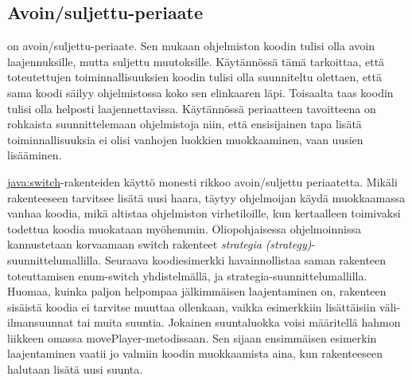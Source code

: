 \documentclass{tufte-book}
\newcommand{\eng}[1]{\textit{(#1)}}
\newcommand{\new}[1]{\textit{\gls{#1}}}
\newcommand{\neweng}[2]{\new{#1} \eng{#2}}
\newcommand{\java}[1]{\underline{\gls{java:#1}}}
\newcommand{\code}[3]{
\begin{listing}
    \inputminted{java}{OhjelmointiopasEsimerkit/src/#1/#2.java}
    \caption{#3}
    \label{Java-#1-#2}
\end{listing}
}
\begin{document}
\subsection{Avoin/suljettu-periaate}
\label{OCP}

 on \gls{avoin/suljettu-periaate}. Sen mukaan ohjelmiston
koodin tulisi olla avoin laajennuksille, mutta suljettu muutoksille. Käytännössä tämä tarkoittaa,
että toteutettujen toiminnallisuuksien koodin tulisi olla suunniteltu olettaen, että sama koodi
säilyy ohjelmistossa koko sen elinkaaren läpi. Toisaalta taas koodin tulisi olla helposti
laajennettavissa. Käytännössä periaatteen tavoitteena on rohkaista suunnittelemaan ohjelmistoja
niin, että ensisijainen tapa lisätä toiminnallisuuksia ei olisi vanhojen luokkien muokkaaminen,
vaan uusien lisääminen.

 \java{switch}-rakenteiden käyttö monesti rikkoo 
avoin/suljettu periaatetta. Mikäli rakenteeseen tarvitsee lisätä uusi haara, täytyy ohjelmoijan
käydä muokkaamassa vanhaa koodia, mikä altistaa ohjelmiston virhetiloille, kun kertaalleen
toimivaksi todettua koodia muokataan myöhemmin. Oliopohjaisessa ohjelmoinnissa kannustetaan
korvaamaan switch rakenteet \neweng{strategia}{strategy}-suunnittelumallilla. Seuraava
koodiesimerkki havainnollistaa saman rakenteen toteuttamisen enum-switch yhdistelmällä, ja
strategia-suunnittelumallilla. Huomaa, kuinka paljon helpompaa jälkimmäisen laajentaminen on,
rakenteen sisäistä koodia ei tarvitse muuttaa ollenkaan, vaikka esimerkkiin lisättäisiin
väli-ilmansuunnat tai muita suuntia. Jokainen suuntaluokka voisi määritellä hahmon liikkeen
omassa movePlayer-metodissaan. Sen sijaan ensimmäisen esimerkin laajentaminen vaatii jo valmiin
koodin muokkaamista aina, kun rakenteeseen halutaan lisätä uusi suunta.

\code{week9/openclosedexample}{Player}{Pelaaja-luokka, jonka koordinaatteja esimerkissä pyritään
muuttamaan}
\code{week3/enumexample}{CompassPoint}{Ilmansuunnat \java{enum}-luokalla esiteltynä}
\code{week9/openclosedexample}{MoveSwitch}{Hahmon liikuttaminen \java{switch}-rakenteella ja
ilmansuuntia esittävällä \java{enum}-rakenteella}
\code{week9/openclosedexample}{MovementCommand}{Rajapintaluokka hahmon liikkuttamiseen
\gls{strategia}-suunnittelumallilla}
\code{week9/openclosedexample}{MoveNorth}{Liikkumiskomento pohjoiseen}
\code{week9/openclosedexample}{MoveEast}{Liikkumiskomento itään}
\code{week9/openclosedexample}{MoveSouth}{Liikkumiskomento etelään}
\code{week9/openclosedexample}{MoveWest}{Liikkumiskomento länteen}
\code{week9/openclosedexample}{MoveStrategy}{Hahmon liikuttaminen 
\gls{strategia}-suunnittelumallilla}
\end{document}
